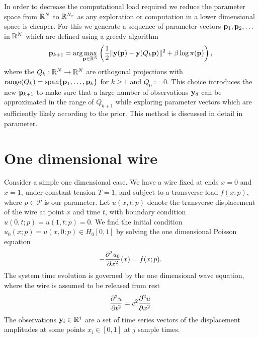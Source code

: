 In order to decrease the computational load required we reduce the parameter space from ${\mathbb R}^N$ to ${\mathbb R}^{N_r}$ as any exploration or computation in a lower dimensional space is cheaper. 
For this we generate a sequence of parameter vectors $\mathbf{p}_1, \mathbf{p}_2,\ldots$ in ${\mathbb R}^N$ which are defined using a greedy algorithm 
\begin{equation}\label{eq:greedyOpt}
\mathbf{p}_{k+1} = \arg\!\max_{\mathbf{p}\in{\mathbb R}^N} \left(\frac{1}{2}\|\mathbf{y}(\mathbf{p})-\mathbf{y}(Q_k \mathbf{p})\|^2 + \beta \log \pi(\mathbf{p})\right),
\end{equation}
where the $Q_k:{\mathbb R}^N\rightarrow {\mathbb R}^N$ are orthogonal projections with 
$\operatorname{range}(Q_k)=\operatorname{span}\{\mathbf{p}_1,\ldots,\mathbf{p}_k\}$ for $k\geq 1$ and $Q_0:=0$. 
This choice introduces the new $\mathbf{p}_{k+1}$ to make sure that a large number of observations $\mathbf{y}_d$ can be approximated in the range of $Q_{k+1}$ while exploring parameter vectors which are sufficiently likely according to the prior. This method is discussed in detail in \cite{lieberman2009}parameter.
%


\section{One dimensional wire}
Consider a simple one dimensional case. We have a wire fixed at ends $x=0$ and $x=1$, under constant tension $T=1$, and subject to a transverse load $f(x;p)$, where $p \in \mathcal{P}$ is our parameter. Let $u(x,t;p)$ denote the transverse displacement of the wire at point $x$ and time $t$, with boundary condition $u(0,t;p)=u(1,t;p)=0$. We find the initial condition $u_0(x;p)=u(x,0;p)\in H_0[0,1]$ by solving the one dimensional Poisson equation
\begin{equation}\label{eq:1dConstraint}
-\frac{{\partial}^2 u_0}{{\partial} x^2}(x) = f(x;p). 
\end{equation}
The system time evolution is governed by the one dimensional wave equation, where the wire is assumed to be released from rest
\begin{equation}\label{eq:1dEvolution}
\frac{{\partial}^2 u}{{\partial} t^2}=c^2 \frac{{\partial}^2 u}{{\partial} x^2}
\end{equation}
The observations $\mathbf{y}_i \in \mathbb{R}^j$ are a set of time series vectors of the displacement amplitudes at some points $x_i \in [0,1]$ at $j$ sample times. 

